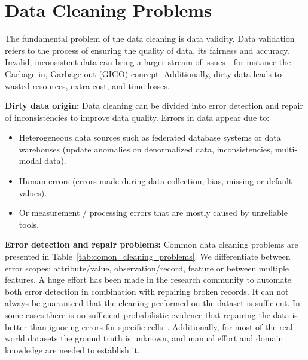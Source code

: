 \section{Data Cleaning Problems}
\label{sec:data_cleaning_problems}

The fundamental problem of the data cleaning is data validity.
Data validation refers to the process of ensuring the quality of data, its fairness and accuracy. 
Invalid, inconsistent data can bring a larger stream of issues - for instance the Garbage in, Garbage out (GIGO) concept.
Additionally, dirty data leads to wasted resources, extra cost, and time losses.

\textbf{Dirty data origin:} 
Data cleaning can be divided into error detection and repair of inconsistencies to improve data quality.
Errors in data appear due to:

\begin{itemize}
    \item Heterogeneous data sources such as federated database systems or
    data warehouses (update anomalies on denormalized data, inconsistencies, multi-modal data).
    \item Human errors (errors made during data collection, bias, missing or default values).
    \item Or measurement / processing errors that are mostly caused by unreliable tools.
\end{itemize}

\textbf{Error detection and repair problems:}
Common data cleaning problems are presented in Table~\ref{tab:comon_cleaning_problems}.
We differentiate between error scopes: attribute/value, observation/record, feature or between multiple features. 
A huge effort has been made in the research community to automate both error detection in combination with  repairing broken records. 
It can not always be guaranteed that the cleaning performed on the dataset is sufficient.
In some cases there is no sufficient probabilistic evidence that repairing the data is better than ignoring errors for specific cells~\cite{RekatsinasCIR2017}. 
Additionally, for most of the real-world datasets the ground truth is unknown, and manual effort and domain knowledge are needed to establish it.

